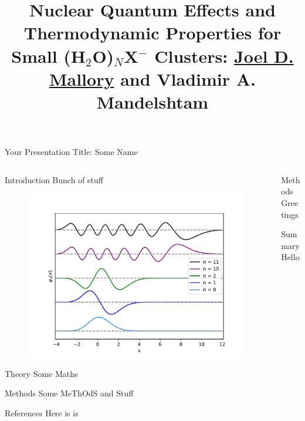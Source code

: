 \documentclass[t,10pt,xcolor=pst,pdftex,final,hyperref={pdfpagelabels=false}]{beamer}
\title[\footnotesize{Diffusion Monte Carlo}]{Nuclear Quantum Effects and Thermodynamic Properties for Small (H$_2$O)$_N$X$^-$ Clusters: \underline{Joel D. Mallory} and Vladimir A. Mandelshtam}
\author[\footnotesize{Acknowledgments: Shane Flynn}]{}
\institute[\footnotesize{Department of Chemistry, University of California, Irvine}]{}
\begin{document}
\begin{frame}{\Large{Your Presentation Title: Some Name}}
\begin{columns}[t]
\begin{column}{0.50\linewidth}
\begin{block}{Introduction}
  Bunch of stuff
  \begin{figure}[H]
  \includegraphics[width=40cm]{../plots/morse_states.pdf}
  \end{figure}
\end{block}

\begin{block}{Theory}
	Some Maths
\end{block}

\begin{block}{Methods}
	Some MeThOdS and Stuff
\end{block}

\begin{block}{References}
	Here is is
\end{block}

\end{column}
\begin{column}{0.50\linewidth}
\begin{block}{Methods}
Greetings
\end{block}

\begin{block}{Summary}
Hello
\end{block}

\end{column}
\end{columns}
\end{frame}
\end{document}

